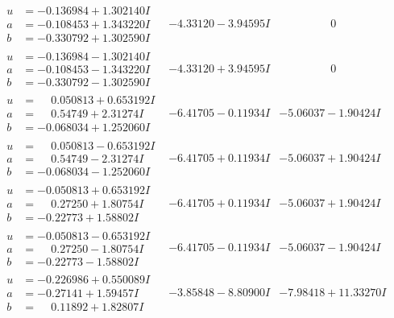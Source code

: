 \documentclass[1p]{elsarticle_modified}
\theoremstyle{definition}
\begin{document}
$$\begin{array}{c|c|c}
\begin{aligned}
u &= -0.136984 + 1.302140 I \\
a &= -0.108453 + 1.343220 I \\
b &= -0.330792 + 1.302590 I\end{aligned}
 & -4.33120 - 3.94595 I & \phantom{-0.000000 } 0 \\ \hline\begin{aligned}
u &= -0.136984 - 1.302140 I \\
a &= -0.108453 - 1.343220 I \\
b &= -0.330792 - 1.302590 I\end{aligned}
 & -4.33120 + 3.94595 I & \phantom{-0.000000 } 0 \\ \hline\begin{aligned}
u &= \phantom{-}0.050813 + 0.653192 I \\
a &= \phantom{-}0.54749 + 2.31274 I \\
b &= -0.068034 + 1.252060 I\end{aligned}
 & -6.41705 - 0.11934 I & -5.06037 - 1.90424 I \\ \hline\begin{aligned}
u &= \phantom{-}0.050813 - 0.653192 I \\
a &= \phantom{-}0.54749 - 2.31274 I \\
b &= -0.068034 - 1.252060 I\end{aligned}
 & -6.41705 + 0.11934 I & -5.06037 + 1.90424 I \\ \hline\begin{aligned}
u &= -0.050813 + 0.653192 I \\
a &= \phantom{-}0.27250 + 1.80754 I \\
b &= -0.22773 + 1.58802 I\end{aligned}
 & -6.41705 + 0.11934 I & -5.06037 + 1.90424 I \\ \hline\begin{aligned}
u &= -0.050813 - 0.653192 I \\
a &= \phantom{-}0.27250 - 1.80754 I \\
b &= -0.22773 - 1.58802 I\end{aligned}
 & -6.41705 - 0.11934 I & -5.06037 - 1.90424 I \\ \hline\begin{aligned}
u &= -0.226986 + 0.550089 I \\
a &= -0.27141 + 1.59457 I \\
b &= \phantom{-}0.11892 + 1.82807 I\end{aligned}
 & -3.85848 - 8.80900 I & -7.98418 + 11.33270 I \\ \hline\begin{aligned}

\end{aligned}
\end{array}$$
\end{document}
